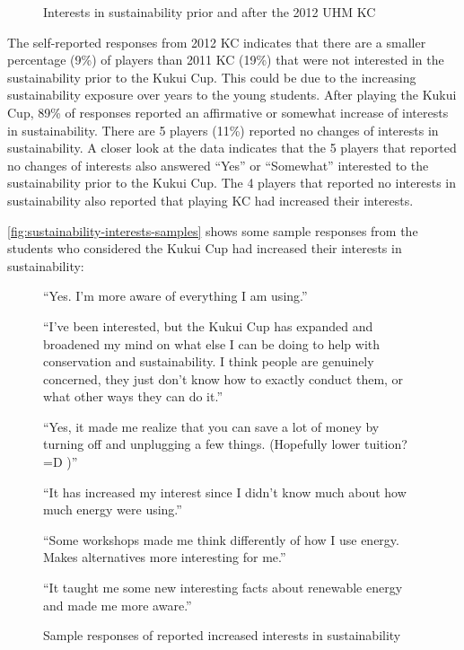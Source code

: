 \begin{figure}[htbp]
	\centering
		\caption{Interests in sustainability prior and after the 2012 UHM KC}
		\label{fig:effect-prior-after-2012}
\end{figure}

The self-reported responses from 2012 KC indicates that there are a smaller percentage (9\%) of players than 2011 KC (19\%) that were not interested in the sustainability prior to the Kukui Cup. This could be due to the increasing sustainability exposure over years to the young students.  After playing the Kukui Cup, 89\% of responses reported an affirmative or somewhat increase of interests in sustainability. There are 5 players (11\%)  reported no changes of interests in sustainability. A closer look at the data indicates that the 5 players that reported no changes of interests also answered ``Yes'' or ``Somewhat'' interested to the sustainability prior to the Kukui Cup. The 4 players that reported no interests in sustainability also reported that playing KC had increased their interests.

\autoref{fig:sustainability-interests-samples} shows some sample responses from the students who considered the Kukui Cup had increased their interests in sustainability:
 
 \begin{figure}[ht!]
\begin{mybox}
\begin{compactenum}
	\item ``Yes. I'm more aware of everything I am using.''
	\item ``I've been interested, but the Kukui Cup has expanded and broadened my mind on what else I can be doing to help with conservation and sustainability. I think people are genuinely concerned, they just don't know how to exactly conduct them, or what other ways they can do it.''
	\item ``Yes, it made me realize that you can save a lot of money by turning off and unplugging a few things. (Hopefully lower tuition? =D )''
	\item ``It has increased my interest since I didn't know much about how much energy were using.''
	\item ``Some workshops made me think differently of how I use energy. Makes alternatives more interesting for me.''
	\item ``It taught me some new interesting facts about renewable energy and made me more aware.''	
\end{compactenum}
\end{mybox}
\caption{Sample responses of reported increased interests in sustainability}
\label{fig:sustainability-interests-samples}  
\end{figure}

